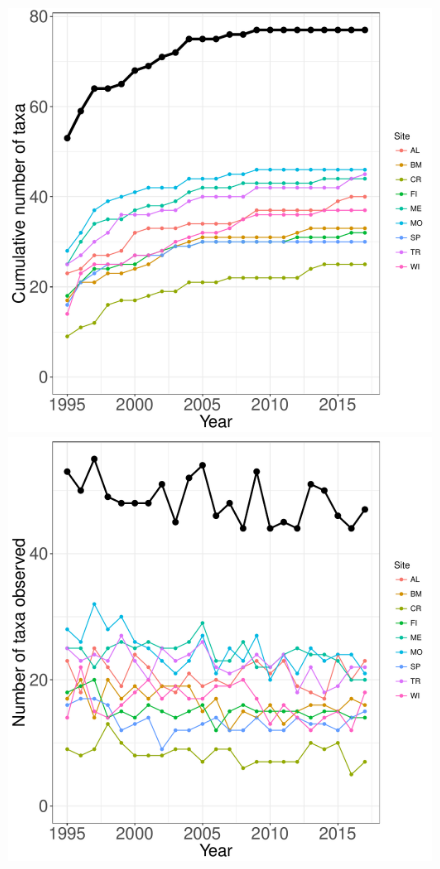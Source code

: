 \documentclass[11pt, oneside]{article}
\begin{document}
\begin{figure}[h!]
\centering
\includegraphics[scale = 0.4]{ntl-fish-stanleyLottig_species_accumulation_curve.pdf}
\includegraphics[scale = 0.4]{ntl-fish-stanleyLottig_num_taxa_over_time.pdf}

\end{figure}
\end{document}

